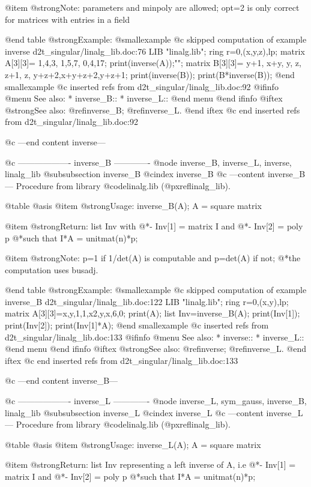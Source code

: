 @item @strong{Note:}
parameters and minpoly are allowed; opt=2 is only correct for
matrices with entries in a field

@end table
@strong{Example:}
@smallexample
@c skipped computation of example inverse d2t_singular/linalg_lib.doc:76 
LIB "linalg.lib";
ring r=0,(x,y,z),lp;
matrix A[3][3]=
1,4,3,
1,5,7,
0,4,17;
print(inverse(A));"";
matrix B[3][3]=
y+1,  x+y,    y,
z,    z+1,    z,
y+z+2,x+y+z+2,y+z+1;
print(inverse(B));
print(B*inverse(B));
@end smallexample
@c inserted refs from d2t_singular/linalg_lib.doc:92
@ifinfo
@menu
See also:
* inverse_B::
* inverse_L::
@end menu
@end ifinfo
@iftex
@strong{See also:}
@ref{inverse_B};
@ref{inverse_L}.
@end iftex
@c end inserted refs from d2t_singular/linalg_lib.doc:92

@c ---end content inverse---

@c ------------------- inverse_B -------------
@node inverse_B, inverse_L, inverse, linalg_lib
@subsubsection inverse_B
@cindex inverse_B
@c ---content inverse_B---
Procedure from library @code{linalg.lib} (@pxref{linalg_lib}).

@table @asis
@item @strong{Usage:}
inverse_B(A); A = square matrix

@item @strong{Return:}
list Inv with
@*- Inv[1] = matrix I and
@*- Inv[2] = poly p
@*such that I*A = unitmat(n)*p;

@item @strong{Note:}
p=1 if 1/det(A) is computable and p=det(A) if not;
@*the computation uses busadj.

@end table
@strong{Example:}
@smallexample
@c skipped computation of example inverse_B d2t_singular/linalg_lib.doc:122 
LIB "linalg.lib";
ring r=0,(x,y),lp;
matrix A[3][3]=x,y,1,1,x2,y,x,6,0;
print(A);
list Inv=inverse_B(A);
print(Inv[1]);
print(Inv[2]);
print(Inv[1]*A);
@end smallexample
@c inserted refs from d2t_singular/linalg_lib.doc:133
@ifinfo
@menu
See also:
* inverse::
* inverse_L::
@end menu
@end ifinfo
@iftex
@strong{See also:}
@ref{inverse};
@ref{inverse_L}.
@end iftex
@c end inserted refs from d2t_singular/linalg_lib.doc:133

@c ---end content inverse_B---

@c ------------------- inverse_L -------------
@node inverse_L, sym_gauss, inverse_B, linalg_lib
@subsubsection inverse_L
@cindex inverse_L
@c ---content inverse_L---
Procedure from library @code{linalg.lib} (@pxref{linalg_lib}).

@table @asis
@item @strong{Usage:}
inverse_L(A); A = square matrix

@item @strong{Return:}
list Inv representing a left inverse of A, i.e
@*- Inv[1] = matrix I and
@*- Inv[2] = poly p
@*such that I*A = unitmat(n)*p;

